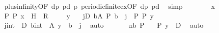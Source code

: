 \begin{isabellebody}
\ plusinfinity{\isacharbrackleft}{\kern0pt}OF\ dp\ pd\ p{}{\isacharbrackright}{\kern0pt}\ periodic{\isacharunderscore}{\kern0pt}finite{\isacharunderscore}{\kern0pt}ex{\isacharbrackleft}{\kern0pt}OF\ dp\ pd{\isacharbrackright}{\kern0pt}\ \isamarkupfalse%
\ simp\isacommand{{\isacharbraceright}{\kern0pt}}\isamarkupfalse%
\isanewline
\ \isamarkupfalse%
\ \isanewline
\ \isacommand{{\isacharbraceleft}{\kern0pt}}\isamarkupfalse%
\ \isamarkupfalse%
\ x\isanewline
\ \ \ \isamarkupfalse%
\ P{\isacharcolon}{\kern0pt}\ {\isachardoublequoteopen}P\ x{\isachardoublequoteclose}\ \ H{\isacharcolon}{\kern0pt}\ {\isachardoublequoteopen}{\isasymnot}\ {\isacharquery}{\kern0pt}R{}{\isachardoublequoteclose}\isanewline
\ \ \ \isacommand{{\isacharbraceleft}{\kern0pt}}\isamarkupfalse%
\isamarkupfalse%
\ y\ \isamarkupfalse%
\ {\isachardoublequoteopen}{\isasymnot}\ {\isacharparenleft}{\kern0pt}{\isasymexists}j{\isasymin}{\isacharbraceleft}{\kern0pt}{}{\isachardot}{\kern0pt}{\isachardot}{\kern0pt}D{\isacharbraceright}{\kern0pt}{\isachardot}{\kern0pt}\ {\isasymexists}b{\isasymin}A{\isachardot}{\kern0pt}\ P\ {\isacharparenleft}{\kern0pt}b\ {\isacharminus}{\kern0pt}\ j{\isacharparenright}{\kern0pt}{\isacharparenright}{\kern0pt}{\isachardoublequoteclose}\ \ P{\isacharcolon}{\kern0pt}\ {\isachardoublequoteopen}P\ y{\isachardoublequoteclose}\isanewline
\ \ \ \ \ \isamarkupfalse%
\ {\isachardoublequoteopen}{\isasymnot}{\isacharparenleft}{\kern0pt}{\isasymexists}{\isacharparenleft}{\kern0pt}j{\isacharcolon}{\kern0pt}{\isacharcolon}{\kern0pt}int{\isacharparenright}{\kern0pt}\ {\isasymin}\ {\isacharbraceleft}{\kern0pt}{}{\isachardot}{\kern0pt}{\isachardot}{\kern0pt}D{\isacharbraceright}{\kern0pt}{\isachardot}{\kern0pt}\ {\isasymexists}{\isacharparenleft}{\kern0pt}b{\isacharcolon}{\kern0pt}{\isacharcolon}{\kern0pt}int{\isacharparenright}{\kern0pt}\ {\isasymin}\ A{\isachardot}{\kern0pt}\ y\ {\isacharequal}{\kern0pt}\ b\ {\isacharminus}{\kern0pt}\ j{\isacharparenright}{\kern0pt}{\isachardoublequoteclose}\ \isamarkupfalse%
\ auto\isanewline
\ \ \ \ \ \isamarkupfalse%
\ nb\ P\ \ \isamarkupfalse%
\ {\isachardoublequoteopen}P\ {\isacharparenleft}{\kern0pt}y\ {\isacharplus}{\kern0pt}\ D{\isacharparenright}{\kern0pt}{\isachardoublequoteclose}\ \isamarkupfalse%
\ auto\ \isacommand{{\isacharbraceright}{\kern0pt}}\isamarkupfalse%
\isanewline

\end{isabellebody}
